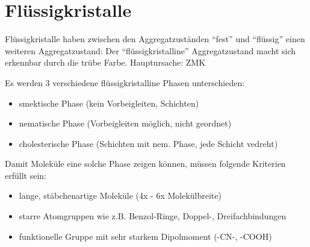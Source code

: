 \section{Flüssigkristalle}
Flüssigkristalle haben zwischen den Aggregatzuständen ``fest'' und ``flüssig'' einen weiteren Aggregatzustand: 
Der ``flüssigkristalline'' Aggregatzustand macht sich erkennbar durch die trübe Farbe. Hauptursache: ZMK   

Es werden 3 verschiedene flüssigkristalline Phasen unterschieden:
\begin{itemize}
    \item smektische Phase (kein Vorbeigleiten, Schichten)
    \item nematische Phase (Vorbeigleiten möglich, nicht geordnet)
    \item cholesterische Phase (Schichten mit nem. Phase, jede Schicht vedreht)
\end{itemize}
Damit Moleküle eine solche Phase zeigen können, müssen folgende Kriterien erfüllt sein:
\begin{itemize}
    \item lange, stäbchenartige Moleküle (4x - 6x Molekülbreite)
    \item starre Atomgruppen wie z.B. Benzol-Ringe, Doppel-, Dreifachbindungen
    \item funktionelle Gruppe mit sehr starkem Dipolmoment (-CN-, -COOH)
\end{itemize}

